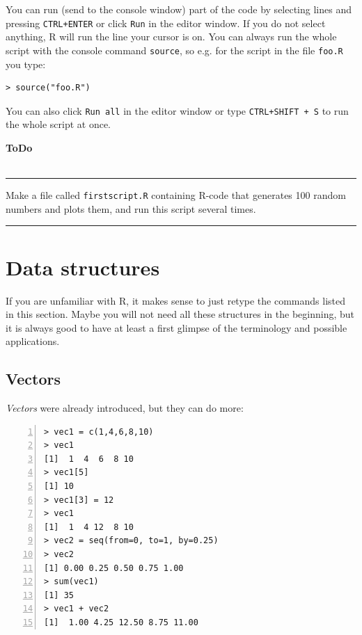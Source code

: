 \documentclass[a4paper,11pt,twocolumn,tablecaptionabove]{scrartcl}
\newenvironment{ToDo} {%
  \begin{flushright}
    \hfill
    \begin{minipage}{0.95\columnwidth}         %
    \textsf{\textbf{ToDo}} \\
      \vspace{-0.85cm}\\
      {\color{Gray}\rule[-0.1cm]{\columnwidth}{1.5pt}}} { %
      {\color{Gray} \rule[0.3cm]{\columnwidth}{1.5pt}}
    \end{minipage}
    \vspace{1em}
  \end{flushright}
  }
\begin{document}
You can run (send to the console window) part of the code by selecting lines and pressing \texttt{CTRL+ENTER} or click \texttt{Run} in the editor window.
If you do not select anything, R will run the line your cursor is on.
You can always  run the whole script with the console command \texttt{source},
so e.g. for the script in the file \texttt{foo.R} you type:
\begin{Verbatim}[frame=single,gobble=0]
> source("foo.R")
\end{Verbatim}
You can also click \texttt{Run all} in the editor window or type \texttt{CTRL+SHIFT + S} to run the whole script at once.

\begin{ToDo}
  Make a file called \texttt{firstscript.R} containing R-code that generates 100
  random numbers and plots them, and run this script several times.\\
\end{ToDo}


\section{Data structures} 
\label{sec:structures}

If you are unfamiliar with R, it makes sense to just retype the commands
listed in this section. Maybe you will not need all these structures in the
beginning, but it is always good to have at least a first glimpse of the
terminology and possible applications.

\subsection{Vectors}

\emph{Vectors} were already introduced, but they can do more:

\begin{Verbatim}[frame=single,numbers=left,gobble=0, xleftmargin=0.35cm, numbersep=0.1cm]
> vec1 = c(1,4,6,8,10)
> vec1
[1]  1  4  6  8 10
> vec1[5]
[1] 10
> vec1[3] = 12
> vec1
[1]  1  4 12  8 10
> vec2 = seq(from=0, to=1, by=0.25)
> vec2
[1] 0.00 0.25 0.50 0.75 1.00
> sum(vec1)
[1] 35
> vec1 + vec2
[1]  1.00 4.25 12.50 8.75 11.00
\end{Verbatim}
\end{document}
